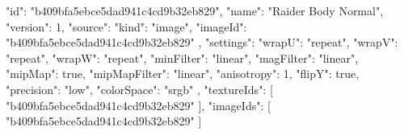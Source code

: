 {
  "id": "b409bfa5ebce5dad941c4cd9b32eb829",
  "name": "Raider Body Normal",
  "version": 1,
  "source": {
    "kind": "image",
    "imageId": "b409bfa5ebce5dad941c4cd9b32eb829"
  },
  "settings": {
    "wrapU": "repeat",
    "wrapV": "repeat",
    "wrapW": "repeat",
    "minFilter": "linear",
    "magFilter": "linear",
    "mipMap": true,
    "mipMapFilter": "linear",
    "anisotropy": 1,
    "flipY": true,
    "precision": "low",
    "colorSpace": "srgb"
  },
  "textureIds": [
    "b409bfa5ebce5dad941c4cd9b32eb829"
  ],
  "imageIds": [
    "b409bfa5ebce5dad941c4cd9b32eb829"
  ]
}
